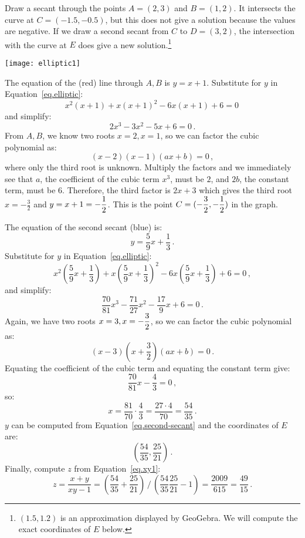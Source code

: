 Draw a secant through the points $A=(2,3)$ and $B=(1,2)$. It intersects the curve at $C=(-1.5,-0.5)$, but this does not give a solution because the values are negative. If we draw a second secant from $C$ to $D=(3,2)$, the intersection with the curve at $E$ does give a new solution.\footnote{$(1.5,1.2)$ is an approximation displayed by GeoGebra. We will compute the exact coordinates of $E$ below.}

\begin{center}
\texttt{[image: elliptic1]}
\end{center}

The equation of the (red) line through $A,B$ is $y=x+1$. Substitute for $y$ in Equation~\ref{eq.elliptic}:
\[
x^2(x+1) + x(x+1)^2 -6x(x+1) +6 =0\,
\]
and simplify:
\[
2x^3 -3x^2 -5x +6 =0\,.
\]
From $A,B$, we know two roots $x=2,x=1$, so we can factor the cubic polynomial as:
\[
(x-2)(x-1)(ax+b)=0\,,
\]
where only the third root is unknown. Multiply the factors and we immediately see that $a$, the coefficient of the cubic term $x^3$, must be $2$, and $2b$, the constant term, must be $6$. Therefore, the third factor is $2x+3$ which gives the third root $x=-\frac{3}{2}$ and $y=x+1=-\displaystyle\frac{1}{2}$. This is the point $C=(-\displaystyle\frac{3}{2},-\displaystyle\frac{1}{2})$ in the graph.

The equation of the second secant (blue) is:
\begin{equation}
y = \frac{5}{9}x + \frac{1}{3}\,.\label{eq.second-secant}
\end{equation}
Substitute for $y$ in Equation~\ref{eq.elliptic}:
\[
x^2\left(\frac{5}{9}x + \frac{1}{3}\right) + x\left(\frac{5}{9}x + \frac{1}{3}\right)^2 -6x\left(\frac{5}{9}x + \frac{1}{3}\right) +6 =0\,,
\]
and simplify:
\[
\frac{70}{81}x^3 - \frac{71}{27}x^2 - \frac{17}{9}x +6 =0\,.
\]
Again, we have two roots $x=3,x=-\displaystyle\frac{3}{2}$, so we can factor the cubic polynomial as:
\[
(x-3)\left(x+\frac{3}{2}\right)(ax+b)=0\,.
\]
Equating the coefficient of the cubic term and equating the constant term give:
\[
\frac{70}{81}x - \frac{4}{3}=0\,,
\]
so:
\[
x=\frac{81}{70}\cdot \frac{4}{3}= \frac{27\cdot 4}{70} = \frac{54}{35}\,.
\]
$y$ can be computed from Equation~\ref{eq.second-secant} and the coordinates of $E$ are:
\[
\left(\frac{54}{35}, \frac{25}{21}\right)\,.
\]
Finally, compute $z$ from Equation~\ref{eq.xy1}:
\[
z=\frac{x+y}{xy-1}=%
\displaystyle\left(\frac{54}{35} + \frac{25}{21}\right)%
 \, / \,%
\displaystyle\left(\frac{54}{35}\frac{25}{21}-1\right)=%
\frac{2009}{615} = \frac{49}{15}\,.
\]


